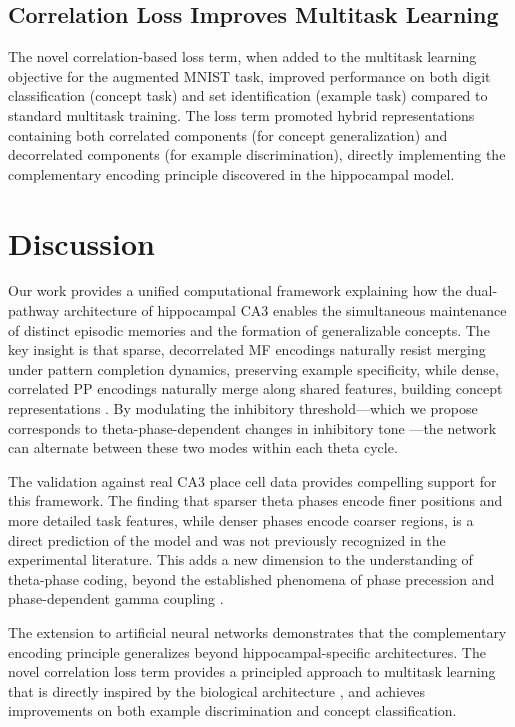 \documentclass[11pt]{article}
\begin{document}
\subsection{Correlation Loss Improves Multitask Learning}

The novel correlation-based loss term, when added to the multitask learning objective for the augmented MNIST task, improved performance on both digit classification (concept task) and set identification (example task) compared to standard multitask training. The loss term promoted hybrid representations containing both correlated components (for concept generalization) and decorrelated components (for example discrimination), directly implementing the complementary encoding principle discovered in the hippocampal model.

\section{Discussion}

Our work provides a unified computational framework explaining how the dual-pathway architecture of hippocampal CA3 enables the simultaneous maintenance of distinct episodic memories and the formation of generalizable concepts. The key insight is that sparse, decorrelated MF encodings naturally resist merging under pattern completion dynamics, preserving example specificity, while dense, correlated PP encodings naturally merge along shared features, building concept representations \citep{marr1971simple, treves1992computational}. By modulating the inhibitory threshold---which we propose corresponds to theta-phase-dependent changes in inhibitory tone \citep{buzsaki2002theta, hasselmo2002proposed}---the network can alternate between these two modes within each theta cycle.

The validation against real CA3 place cell data provides compelling support for this framework. The finding that sparser theta phases encode finer positions and more detailed task features, while denser phases encode coarser regions, is a direct prediction of the model and was not previously recognized in the experimental literature. This adds a new dimension to the understanding of theta-phase coding, beyond the established phenomena of phase precession \citep{skaggs1996theta} and phase-dependent gamma coupling \citep{colgin2009frequency}.

The extension to artificial neural networks demonstrates that the complementary encoding principle generalizes beyond hippocampal-specific architectures. The novel correlation loss term provides a principled approach to multitask learning that is directly inspired by the biological architecture \citep{ruder2017overview}, and achieves improvements on both example discrimination and concept classification.
\end{document}
